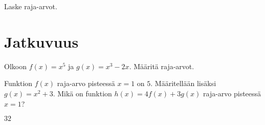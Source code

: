 \begin{tehtavasivu}

\begin{tehtava}
Laske raja-arvot.
\end{tehtava}

\begin{tehtava}
Laske raja-arvot.
\alakohdat{
§$\lim\limits_{x \to 5} \frac{x^2-3}{x-3}$
§$\lim\limits_{x \to 4} \frac{6}{7-x}$
§$\lim\limits_{x \to -1} \frac{x^-3-x^2}{2x+1}$
\end{tehtava}

\end{tehtavasivu}



\section{Jatkuvuus}

\begin{tehtavasivu}


\begin{tehtava}
	Olkoon $f(x)=x^5$ ja $g(x)=x^3-2x$. Määritä raja-arvot.
	\begin{alakohdat}
	\end{alakohdat}
	\begin{vastaus}
		\begin{alakohdat}
			\alakohta{$32$}
			\alakohta{$4$}
			\alakohta{$36$}
			\alakohta{$128$}
		\end{alakohdat}
	\end{vastaus}
\end{tehtava}

\begin{tehtava}
	Funktion $f(x)$ raja-arvo pisteessä $x=1$ on $5$. Määritellään lisäksi $g(x) = x^2+3$. Mikä on funktion $h(x) = 4f(x) + 3g(x)$ raja-arvo pisteessä $x=1$?
	\begin{vastaus}
		$32$
	\end{vastaus}
\end{tehtava}

\end{tehtavasivu}
